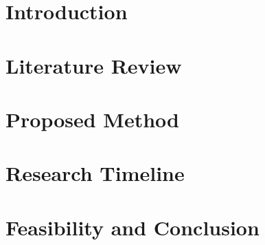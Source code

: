 \documentclass[a4paper, 12pt]{article}
\begin{document}


\date{}
\tableofcontents
\newpage


\section{Introduction}

\newpage

\section{Literature Review}

\newpage

\section{Proposed Method}

\newpage

% 

\section{Research Timeline}

\newpage

\section{Feasibility and Conclusion}

\newpage



\end{document}
